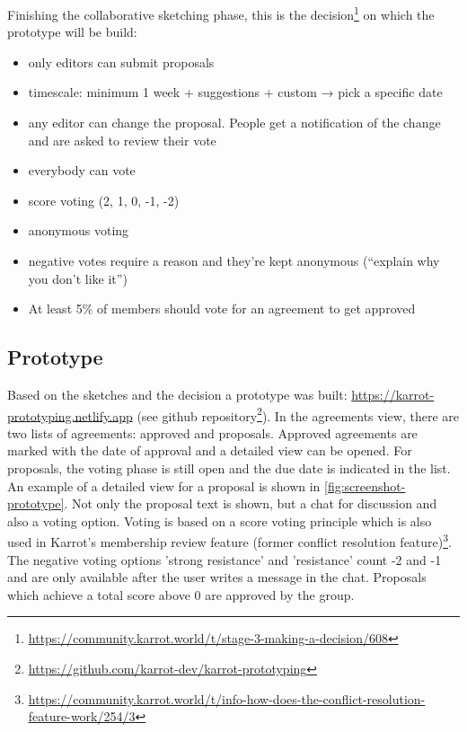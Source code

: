 \documentclass[
	a4paper,%
	11pt,%
	]{article}
\begin{document}
Finishing the collaborative sketching phase, this is the decision\footnote{\label{url:3Decision}\url{https://community.karrot.world/t/stage-3-making-a-decision/608}} on which the prototype will be build:
\begin{itemize}
	\item only editors can submit proposals
	\item timescale: minimum 1 week + suggestions + custom → pick a specific date
	\item any editor can change the proposal. People get a notification of the change and are asked to review their vote
	\item everybody can vote
	\item score voting (2, 1, 0, -1, -2)
	\item anonymous voting
	\item negative votes require a reason and they’re kept anonymous (“explain why you don’t like it”)
	\item At least 5\% of members should vote for an agreement to get approved	
\end{itemize}

    
\subsection{Prototype}\label{subsec:prototype}

Based on the sketches and the decision a prototype was built: \url{https://karrot-prototyping.netlify.app} (see github repository\footnote{\label{url:prototype-github}\url{https://github.com/karrot-dev/karrot-prototyping}}). In the agreements view, there are two lists of agreements: approved and proposals. Approved agreements are marked with the date of approval and a detailed view can be opened. For proposals, the voting phase is still open and the due date is indicated in the list. An example of a detailed view for a proposal is shown in \autoref{fig:screenshot-prototype}. Not only the proposal text is shown, but a chat for discussion and also a voting option. Voting is based on a score voting principle which is also used in Karrot's membership review feature (former conflict resolution feature)\footnote{\label{url:score-vote}\href{https://community.karrot.world/t/info-how-does-the-conflict-resolution-feature-work/254/3}{https://community.karrot.world/t/info-how-does-the-conflict-resolution-feature-work/254/3}}. The negative voting options 'strong resistance' and 'resistance' count -2 and -1 and are only available after the user writes a message in the chat. Proposals which achieve a total score above 0 are approved by the group.
\end{document}
